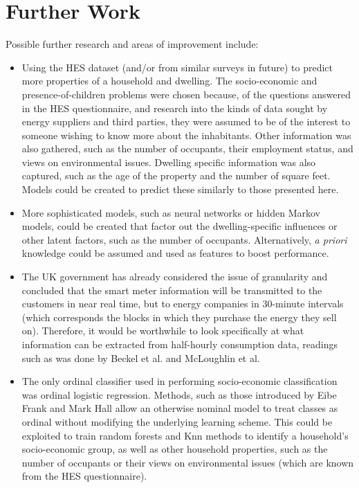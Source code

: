 \section{Further Work}
Possible further research and areas of improvement include:
\begin{itemize}

\item Using the HES dataset (and/or from similar surveys in future) to predict more properties of a household and dwelling. The socio-economic and presence-of-children problems were chosen because, of the questions answered in the HES questionnaire, and research into the kinds of data sought by energy suppliers and third parties, they were assumed to be of the interest to someone wishing to know more about the inhabitants. Other information was also gathered, such as the number of occupants, their employment status, and views on environmental issues. Dwelling specific information was also captured, such as the age of the property and the number of square feet. Models could be created to predict these similarly to those presented here.

\item More sophisticated models, such as neural networks or hidden Markov models, could be created that factor out the dwelling-specific influences or other latent factors, such as the number of occupants. Alternatively, \textit{a priori} knowledge could be assumed and used as features to boost performance.

\item The UK government has already considered the issue of granularity and concluded that the smart meter information will be transmitted to the customers in near real time, but to energy companies in 30-minute intervals \cite{DECC_1} (which corresponds the blocks in which they purchase the energy they sell on).  Therefore, it would be worthwhile to look specifically at what information can be extracted from half-hourly consumption data, readings such as was done by Beckel et al. and McLoughlin et al.\cite{Beckel_2, McLoughlin}

\item The only ordinal classifier used in performing socio-economic classification was ordinal logistic regression. Methods, such as those introduced by Eibe Frank and Mark Hall \cite{Frank} allow an otherwise nominal model to treat classes as ordinal without modifying the underlying learning scheme. This could be exploited to train random forests and Knn methods to identify a household's socio-economic group, as well as other household properties, such as the number of occupants or their views on environmental issues (which are known from the HES questionnaire).
\end{itemize}
